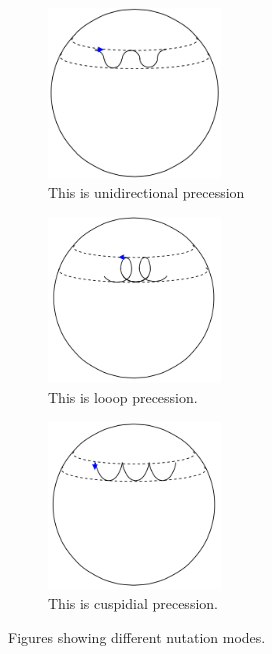 \documentclass{book}
\begin{document}
\begin{figure}
	\centering
	\begin{subfigure}[b]{0.3\textwidth}
		\centering
		\includegraphics[width=130pt]{nutation1.png}
		\caption{This is unidirectional precession}
		\label{unidirectional}
	\end{subfigure}
	\begin{subfigure}[b]{0.3\textwidth}
		\centering
		\includegraphics[width=130pt]{nutation3.png}
		\caption{This is looop precession.}
		\label{looping}
	\end{subfigure}
	\begin{subfigure}[b]{0.3\textwidth}
		\centering
		\includegraphics[width=130pt]{nutation4.png}
		\caption{This is cuspidial precession.}
		\label{cuspidal}
	\end{subfigure}
	\caption{Figures showing different nutation modes.}
\end{figure}
\end{document}
